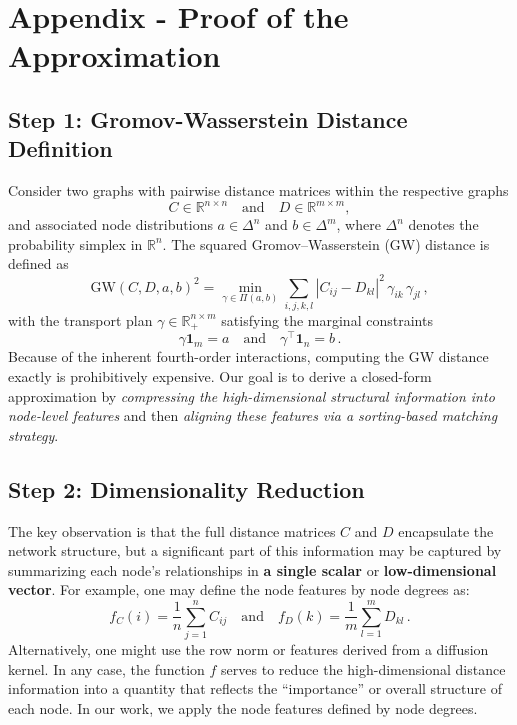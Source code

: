 \documentclass{article}
\begin{document}
\begin{enumerate}
\end{enumerate}



\newpage

\appendix
\section{Appendix - Proof of the Approximation}
\label{Appendix - Proof of the Approximation}

\subsection*{Step 1: Gromov-Wasserstein Distance Definition}

Consider two graphs with pairwise distance matrices within the respective graphs
\[
C \in \mathbb{R}^{n \times n} \quad \text{and} \quad D \in \mathbb{R}^{m \times m},
\]
and associated node distributions \( a \in \Delta^n \) and \( b \in \Delta^m \), where \( \Delta^n \) denotes the probability simplex in \( \mathbb{R}^n \). The squared Gromov–Wasserstein (GW) distance is defined as
\[
\text{GW}(C, D, a, b)^2 = \min_{\gamma \in \Pi(a,b)} \sum_{i,j,k,l} \left| C_{ij} - D_{kl} \right|^2 \, \gamma_{ik} \, \gamma_{jl}\,,
\]
with the transport plan \( \gamma \in \mathbb{R}_+^{n \times m} \) satisfying the marginal constraints
\[
\gamma \mathbf{1}_m = a \quad \text{and} \quad \gamma^\top \mathbf{1}_n = b\,.
\]
Because of the inherent fourth-order interactions, computing the GW distance exactly is prohibitively expensive. Our goal is to derive a closed-form approximation by \textit{compressing the high-dimensional structural information into node-level features} and then \textit{aligning these features via a sorting-based matching strategy}.

\subsection*{Step 2: Dimensionality Reduction}
The key observation is that the full distance matrices \( C \) and \( D \) encapsulate the network structure, but a significant part of this information may be captured by summarizing each node's relationships in \textbf{a single scalar} or \textbf{low-dimensional vector}. For example, one may define the node features by node degrees as:
\[
f_C(i) = \frac{1}{n} \sum_{j=1}^{n} C_{ij} \quad \text{and} \quad f_D(k) = \frac{1}{m} \sum_{l=1}^{m} D_{kl}\,.
\]
Alternatively, one might use the row norm or features derived from a diffusion kernel. In any case, the function \( f \) serves to reduce the high-dimensional distance information into a quantity that reflects the ``importance'' or overall structure of each node. In our work, we apply the node features defined by node degrees.
\end{document}
